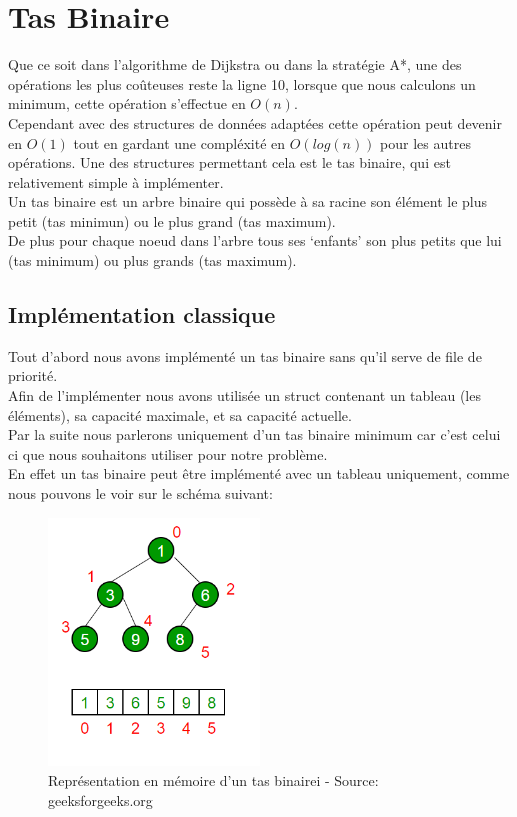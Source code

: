 \documentclass{article}
\begin{document}
\pagebreak
\section{Tas Binaire}

Que ce soit dans l'algorithme de Dijkstra ou dans la stratégie A*, une des opérations les 
plus coûteuses reste la ligne 10, lorsque que nous calculons un minimum, cette opération
s'effectue en $O(n)$.\\
Cependant avec des structures de données adaptées cette opération peut devenir en $O(1)$
tout en gardant une compléxité en $O(log(n))$ pour les autres opérations. Une des structures
permettant cela est le tas binaire, qui est relativement simple à implémenter.\\

Un tas binaire est un arbre binaire qui possède à sa racine son élément le plus petit (tas minimun) ou
le plus grand (tas maximum).\\
De plus pour chaque noeud dans l'arbre tous ses `enfants' son plus petits que lui (tas minimum) ou
plus grands (tas maximum).


\subsection{Implémentation classique}

Tout d'abord nous avons implémenté un tas binaire sans qu'il serve de file de priorité.\\
Afin de l'implémenter nous avons utilisée un struct contenant un tableau (les éléments),
sa capacité maximale, et sa capacité actuelle.\\
Par la suite nous parlerons uniquement d'un tas binaire minimum car c'est celui ci que 
nous souhaitons utiliser pour notre problème.\\

En effet un tas binaire peut être implémenté avec un tableau uniquement, comme nous
pouvons le voir sur le schéma suivant:

\begin{figure}[!hbt]
		\centering
		\includegraphics[width=0.5\textwidth]{binaryheap.png}
		\caption{Représentation en mémoire d'un tas binairei - Source: geeksforgeeks.org}
		\label{vs_3}
\end{figure}
\end{document}
